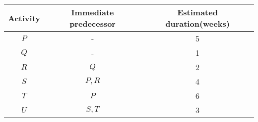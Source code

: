 	\begin{table}[h]
			\centering
	\begin{tabular}{|c|c|c|}
	\hline
		Activity&Immediate predecessor&Estimated duration(weeks)\\
		\hline
		$P$&-&5\\
		\hline
		$Q$&-&1\\
		\hline
		$R$&$Q$&2\\
		\hline
		$S$&$P,R$&4\\
		\hline
		$T$&$P$&6\\
		\hline
		$U$&$S,T$&3\\
		\hline
	\end{tabular}
		\end{table}
